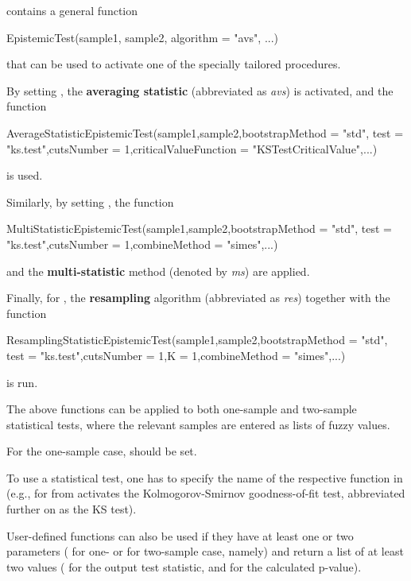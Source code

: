  contains a general function 

\begin{example}
EpistemicTest(sample1, sample2, algorithm = "avs", ...)
\end{example}

that can be used to activate one of the specially tailored procedures.

By setting , the \textbf{averaging statistic} (abbreviated as \emph{avs}) is activated, and the function

\begin{example}
AverageStatisticEpistemicTest(sample1,sample2,bootstrapMethod = "std",
  test = "ks.test",cutsNumber = 1,criticalValueFunction = "KSTestCriticalValue",...)
\end{example}

is used.

Similarly, by setting , the function

\begin{example}
MultiStatisticEpistemicTest(sample1,sample2,bootstrapMethod = "std",
  test = "ks.test",cutsNumber = 1,combineMethod = "simes",...)
\end{example}

and the \textbf{multi-statistic} method (denoted by \emph{ms}) are applied.

Finally, for , the \textbf{resampling} algorithm (abbreviated as \emph{res}) together with the function

\begin{example}
ResamplingStatisticEpistemicTest(sample1,sample2,bootstrapMethod = "std",
  test = "ks.test",cutsNumber = 1,K = 1,combineMethod = "simes",...)
\end{example}

is run.

The above functions can be applied to both one-sample and two-sample statistical tests, where the relevant samples are entered as lists of fuzzy values.

For the one-sample case,  should be set.

To use a statistical test, one has to specify the name of the respective function in  (e.g.,  for  from  activates the Kolmogorov-Smirnov goodness-of-fit test, abbreviated further on as the KS test).

User-defined functions can also be used if they have at least one or two parameters ( for one- or  for two-sample case, namely) and return a list of at least two values ( for the output test statistic, and  for the calculated p-value).

